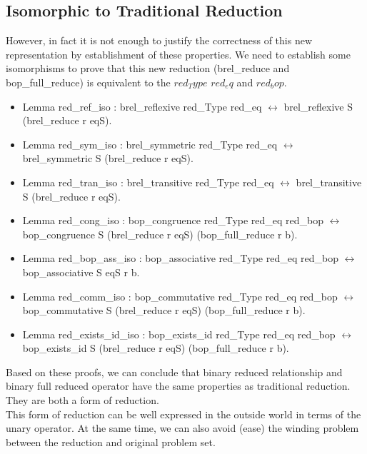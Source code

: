 \documentclass[a4paper,12pt,twoside,openright]{report}
\begin{document}
\subsection{Isomorphic to Traditional Reduction}
However, in fact it is not enough to justify the correctness of this new representation by establishment of these properties. We need to establish some isomorphisms to prove that this new reduction (brel\_reduce and bop\_full\_reduce) is equivalent to the $red_Type$ $red_eq$ and $red_bop$.
\begin{itemize}
\item Lemma red\_ref\_iso : brel\_reflexive red\_Type red\_eq $\leftrightarrow$ brel\_reflexive S (brel\_reduce r eqS).
\item Lemma red\_sym\_iso : brel\_symmetric red\_Type red\_eq $\leftrightarrow$ brel\_symmetric S (brel\_reduce r eqS).
\item Lemma red\_tran\_iso : brel\_transitive red\_Type red\_eq $\leftrightarrow$ brel\_transitive S (brel\_reduce r eqS).
\item Lemma red\_cong\_iso : bop\_congruence red\_Type red\_eq red\_bop $\leftrightarrow$ bop\_congruence S (brel\_reduce r eqS) (bop\_full\_reduce r b).
\item Lemma red\_bop\_ass\_iso : bop\_associative red\_Type red\_eq red\_bop $\leftrightarrow$ bop\_associative S eqS r b.
\item Lemma red\_comm\_iso :  bop\_commutative red\_Type red\_eq red\_bop $\leftrightarrow$ bop\_commutative S (brel\_reduce r eqS) (bop\_full\_reduce r b).
\item Lemma red\_exists\_id\_iso :  bop\_exists\_id red\_Type red\_eq red\_bop $\leftrightarrow$ bop\_exists\_id S (brel\_reduce r eqS) (bop\_full\_reduce r b).
\end{itemize}
Based on these proofs, we can conclude that binary reduced relationship and binary full reduced operator have the same properties as traditional reduction. They are both a form of reduction.\\
This form of reduction can be well expressed in the outside world in terms of the unary operator.
At the same time, we can also avoid (ease) the winding problem between the reduction and original problem set.
\end{document}
